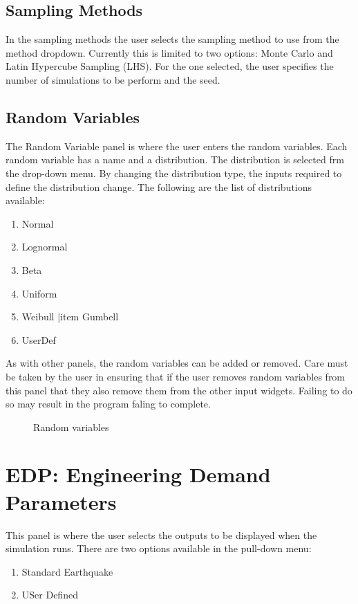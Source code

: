\subsection{Sampling Methods}
In the sampling methods the user selects the sampling method to use from the method dropdown. Currently this is limited to two options: 
Monte Carlo and Latin Hypercube Sampling (LHS). For the one selected, the user specifies the number of simulations to be perform and the seed.

\subsection{Random Variables}
The Random Variable panel is where the user enters the random variables. Each random variable has a name and a distribution. The distribution is selected frm the drop-down menu. By changing the distribution type, the inputs required to define the distribution change. The following are the list of distributions available:
\begin{enumerate}
\item Normal
\item Lognormal
\item Beta
\item Uniform
\item Weibull
|item Gumbell
\item UserDef
\end{enumerate} 

As with other panels, the random variables can be added or removed. Care must be taken by the user in ensuring that if the user removes random variables from this panel that they also remove them from the other input widgets. Failing to do so may result in the program faling to complete.


\begin{figure}[!htbp]
  \caption{Random variables}
  \label{fig:figure11}
\end{figure}

\section{EDP: Engineering Demand Parameters}
This panel is where the user selects the outputs to be displayed when the simulation runs. There are two options available in the pull-down menu:
\begin{enumerate}
\item Standard Earthquake
\item USer Defined
\end{enumerate}

